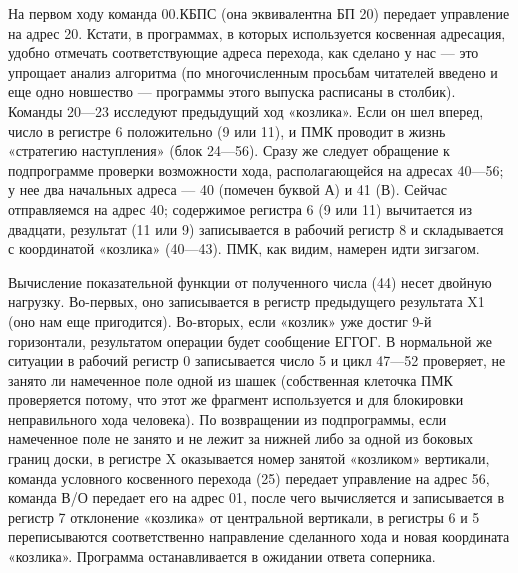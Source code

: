 \documentclass[11pt,a4paper,oneside]{article}
\begin{document}
На первом ходу команда 00.КБПС (она эквивалентна БП 20) передает управление на адрес 20. Кстати, в программах, в которых используется косвенная адресация, удобно отмечать соответствующие адреса перехода, как сделано у нас — это упрощает анализ алгоритма (по многочисленным просьбам читателей введено и еще одно новшество — программы этого выпуска расписаны в столбик). Команды 20—23 исследуют предыдущий ход «козлика». Если он шел вперед, число в регистре 6 положительно (9 или 11), и ПМК проводит в жизнь «стратегию наступления» (блок 24—56). Сразу же следует обращение к подпрограмме проверки возможности хода, располагающейся на адресах 40—56; у нее два начальных адреса — 40 (помечен буквой А) и 41 (В). Сейчас отправляемся на адрес 40; содержимое регистра 6 (9 или 11) вычитается из двадцати, результат (11 или 9) записывается в рабочий регистр 8 и складывается с координатой «козлика» (40—43). ПМК, как видим, намерен идти зигзагом.

Вычисление показательной функции от полученного числа (44) несет двойную нагрузку. Во-первых, оно записывается в регистр предыдущего результата X1 (оно нам еще пригодится). Во-вторых, если «козлик» уже достиг 9-й горизонтали, результатом операции будет сообщение ЕГГОГ. В нормальной же ситуации в рабочий регистр 0 записывается число 5 и цикл 47—52 проверяет, не занято ли намеченное поле одной из шашек (собственная клеточка ПМК проверяется потому, что этот же фрагмент используется и для блокировки неправильного хода человека). По возвращении из подпрограммы, если намеченное поле не занято и не лежит за нижней либо за одной из боковых границ доски, в регистре X оказывается номер занятой «козликом» вертикали, команда условного косвенного перехода (25) передает управление на адрес 56, команда В/О передает его на адрес 01, после чего вычисляется и записывается в регистр 7 отклонение «козлика» от центральной вертикали, в регистры 6 и 5 переписываются соответственно направление сделанного хода и новая координата «козлика». Программа останавливается в ожидании ответа соперника.
\end{document}

